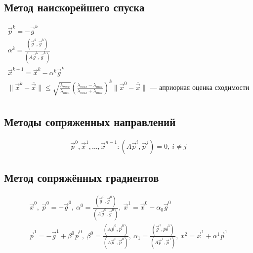 \subsection{Метод наискорейшего спуска}
\begin{gather*}
  \vec{p}^k = -\vec{g}^k \\
  \alpha^k = \frac{(\vec{g}^k, \vec{g}^k)}{(A \vec{g}^k, \vec{g}^k)} \\
  \vec{x}^{k + 1} = \vec{x}^k - \alpha^k \vec{g}^k \\
  \|\vec{x}^k - \overline{\vec{x}}\| \leq
  \sqrt{\frac{\lambda_{max}}{\lambda_{min}}} (\frac{\lambda_{max} -
    \lambda_{min}}{\lambda_{max} + \lambda_{min}})^k \|\vec{x}^0
  -\overline{\vec{x}}\| \text{ --- априорная оценка сходимости}\\
\end{gather*}

\subsection{Методы сопряженных направлений}
\begin{gather*}
   \vec{p}^0, \vec{x}^1, \dotsc, \vec{x}^{n - 1} : (A\vec{p}^i, \vec{p}^j) = 0,\
   i \neq j
\end{gather*}

\subsection{Метод сопряжённых градиентов}
\begin{gather*}
  \vec{x}^0,\ \vec{p}^0 = -\vec{g}^0,\ \alpha^0 = \frac{(\vec{g}^0,
    \vec{g}^0)}{(A\vec{g}^0, \vec{g}^0)},\ \vec{x}^1 = \vec{x}^0 - \alpha_0
  \vec{g}^0 \\ 
  \vec{p}^1 = -\vec{g}^1 + \beta^0 \vec{p}^0,\ \beta^0 =
  \frac{(A\vec{p}^0, \vec{p}^0)}{(A\vec{p}^0, \vec{p}^0)},\ \alpha_1 =
  \frac{(\vec{g}^1, \vec{po}^1)}{(A\vec{p}^1, \vec{p}^1)},\ x^2 = \vec{x}^1 + \alpha^1 \vec{p}^1
\end{gather*}

